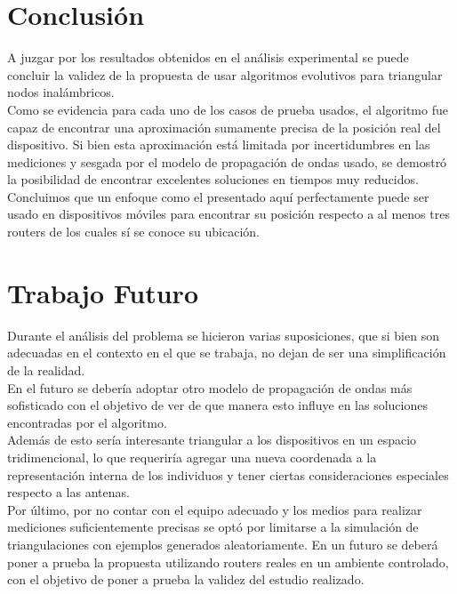 \documentclass[journal]{IEEEtran}
\begin{document}
\section{Conclusión}

A juzgar por los resultados obtenidos en el análisis experimental se puede concluir la validez de la propuesta de usar algoritmos evolutivos para triangular nodos inalámbricos.\\

Como se evidencia para cada uno de los casos de prueba usados, el algoritmo fue capaz de encontrar una aproximación sumamente precisa de la posición real del dispositivo. Si bien esta aproximación está limitada por incertidumbres en las mediciones y sesgada por el modelo de propagación de ondas usado, se demostró la posibilidad de encontrar excelentes soluciones en tiempos muy reducidos.\\

Concluimos que un enfoque como el presentado aquí perfectamente puede ser usado en dispositivos móviles para encontrar su posición respecto a al menos tres routers de los cuales sí se conoce su ubicación.\\

\section{Trabajo Futuro}

Durante el análisis del problema se hicieron varias suposiciones, que si bien son adecuadas en el contexto en el que se trabaja, no dejan de ser una simplificación de la realidad.\\

En el futuro se debería adoptar otro modelo de propagación de ondas más sofisticado con el objetivo de ver de que manera esto influye en las soluciones encontradas por el algoritmo.\\

Además de esto sería interesante triangular a los dispositivos en un espacio tridimencional, lo que requeriría agregar una nueva coordenada a la representación interna de los individuos y tener ciertas consideraciones especiales respecto a las antenas.\\

Por último, por no contar con el equipo adecuado y los medios para realizar mediciones suficientemente precisas se optó por limitarse a la simulación de triangulaciones con ejemplos generados aleatoriamente. En un futuro se deberá poner a prueba la propuesta utilizando routers reales en un ambiente controlado, con el objetivo de poner a prueba la validez del estudio realizado.\\
\end{document}
